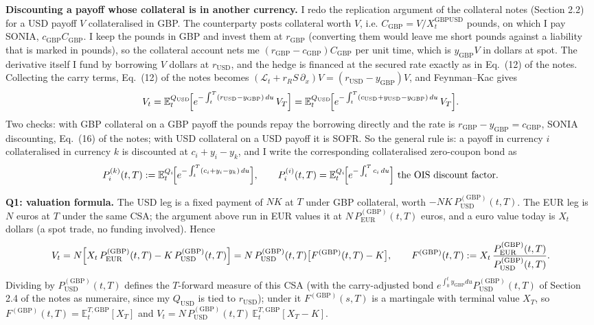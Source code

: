 \documentclass[10pt]{article}
\newcommand{\E}{\mathbb{E}}
\newcommand{\usd}{\mathrm{USD}}\newcommand{\eur}{\mathrm{EUR}}\newcommand{\gbp}{\mathrm{GBP}}
\begin{document}
\textbf{Discounting a payoff whose collateral is in another currency.} I redo the replication argument of the collateral notes
(Section 2.2) for a USD payoff $V$ collateralised in GBP. The counterparty posts collateral worth $V$, i.e. $C_{\gbp}=V/X^{\mathrm{GBPUSD}}_t$
pounds, on which I pay SONIA, $c_{\gbp}C_{\gbp}$. I keep the pounds in GBP and invest them at $r_{\gbp}$ (converting them would leave
me short pounds against a liability that is marked in pounds), so the collateral account nets me $(r_{\gbp}-c_{\gbp})C_{\gbp}$ per unit
time, which is $y_{\gbp}V$ in dollars at spot. The derivative itself I fund by borrowing $V$ dollars at $r_{\usd}$, and the hedge is
financed at the secured rate exactly as in Eq.~(12) of the notes. Collecting the carry terms, Eq.~(12) of the notes becomes
$(\mathcal{L}_t+r_RS\,\partial_x)V=(r_{\usd}-y_{\gbp})V$, and Feynman--Kac gives
\[
V_t=\E^{Q_{\usd}}_t\!\Bigl[e^{-\int_t^T (r_{\usd}-y_{\gbp})\,du}\,V_T\Bigr]
   =\E^{Q_{\usd}}_t\!\Bigl[e^{-\int_t^T (c_{\usd}+y_{\usd}-y_{\gbp})\,du}\,V_T\Bigr].
\]
Two checks: with GBP collateral on a GBP payoff the pounds repay the borrowing directly and the rate is $r_{\gbp}-y_{\gbp}=c_{\gbp}$,
SONIA discounting, Eq.~(16) of the notes; with USD collateral on a USD payoff it is SOFR. So the general rule is: a payoff in currency $i$ collateralised in
currency $k$ is discounted at $c_i+y_i-y_k$, and I write the corresponding collateralised zero-coupon bond as
\[
P^{(k)}_i(t,T):=\E^{Q_i}_t\!\Bigl[e^{-\int_t^T (c_i+y_i-y_k)\,du}\Bigr],\qquad P^{(i)}_i(t,T)=\E^{Q_i}_t\!\Bigl[e^{-\int_t^T c_i\,du}\Bigr]
\text{ the OIS discount factor.}
\]

\textbf{Q1: valuation formula.} The USD leg is a fixed payment of $NK$ at $T$ under GBP collateral, worth $-NK\,P^{(\gbp)}_{\usd}(t,T)$.
The EUR leg is $N$ euros at $T$ under the same CSA; the argument above run in EUR values it at $N\,P^{(\gbp)}_{\eur}(t,T)$ euros,
and a euro value today is $X_t$ dollars (a spot trade, no funding involved). Hence
\[
V_t = N\Bigl[X_t\,P^{(\gbp)}_{\eur}(t,T)-K\,P^{(\gbp)}_{\usd}(t,T)\Bigr]
    = N\,P^{(\gbp)}_{\usd}(t,T)\bigl[F^{(\gbp)}(t,T)-K\bigr],\qquad
F^{(\gbp)}(t,T):=X_t\,\frac{P^{(\gbp)}_{\eur}(t,T)}{P^{(\gbp)}_{\usd}(t,T)}.
\]
Dividing by $P^{(\gbp)}_{\usd}(t,T)$ defines the $T$-forward measure of this CSA (with the carry-adjusted bond
$e^{\int_0^t y_{\gbp}du}P^{(\gbp)}_{\usd}(t,T)$ of Section 2.4 of the notes as numeraire, since my $Q_{\usd}$ is tied to $r_{\usd}$);
under it $F^{(\gbp)}(s,T)$ is a martingale with terminal value $X_T$, so $F^{(\gbp)}(t,T)=\E^{T,\gbp}_t[X_T]$ and
$V_t=N\,P^{(\gbp)}_{\usd}(t,T)\,\E^{T,\gbp}_t[X_T-K]$.
\end{document}
